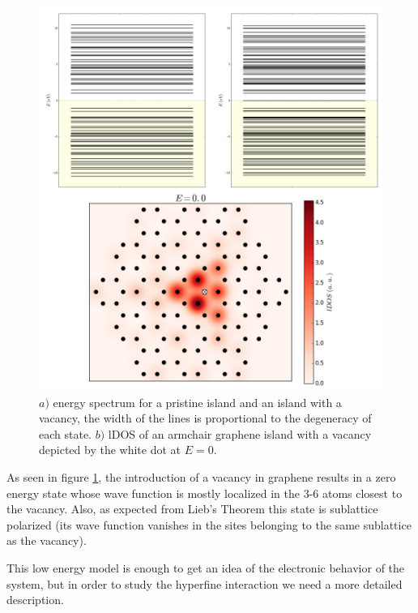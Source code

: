 \begin{figure}[h!]
\centering
\includegraphics{chapter05/figures/espectro.png}
\vspace{-5pt}
\caption{$a)$ energy spectrum for a pristine island and an island with a vacancy, the width of the lines is proportional to the degeneracy of each state. $b)$ \ac{lDOS} of an armchair graphene island with a vacancy depicted by the white dot at $E=0$.}
\label{spectrum1}
\end{figure}
\FloatBarrier

As seen in figure \ref{spectrum1}, the introduction of a vacancy in graphene results in a zero energy state whose wave function is mostly localized in the 3-6 atoms closest to the vacancy. Also, as expected from Lieb's Theorem this state is sublattice polarized (its wave function vanishes in the sites belonging to the same sublattice as the vacancy).

This low energy model is enough to get an idea of the electronic behavior of the system, but in order to study the hyperfine interaction we need a more detailed description.

